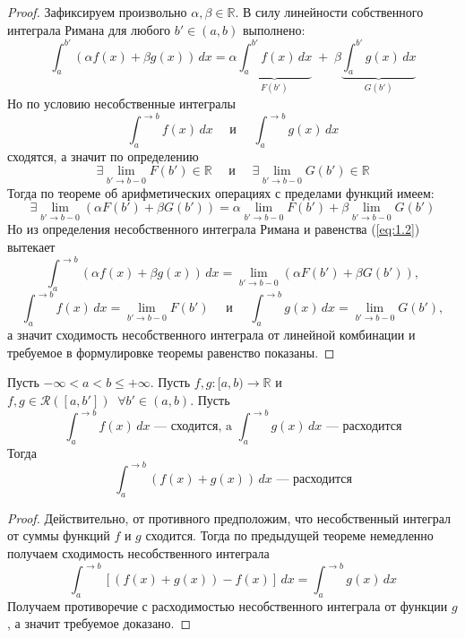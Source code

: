 \documentclass[11pt]{article}
\begin{document}
\begin{proof}
    Зафиксируем произвольно $\alpha, \beta \in \mathbb{R}$. В силу линейности собственного интеграла Римана для любого $b' \in (a, b)$ выполнено:
    \begin{equation*} \label{eq:1.2} \tag{$\ast \ast$}
      \int_{a}^{b'} (\alpha f(x) + \beta g(x)) \, dx = \alpha \underbrace{\int_{a}^{b'} f(x) \, dx}_{F(b')} \; + \; \beta \underbrace{\int_{a}^{b'} g(x) \, dx}_{G(b')}  
    \end{equation*}
    Но по условию несобственные интегралы
    \[\int_{a}^{\to b} f(x) \, dx \quad \text{ и } \quad \int_{a}^{\to b} g(x) \, dx\]
    сходятся, а значит по определению 
    \[\exists \lim_{b' \to b - 0} F(b') \in \mathbb{R} \quad \text{ и } \quad \exists \lim_{b' \to b - 0} G(b') \in \mathbb{R}\]
    Тогда по теореме об арифметических операциях с пределами функций имеем:
    \[\exists \lim_{b' \to b - 0} (\alpha F(b') + \beta G(b')) = \alpha \lim_{b' \to b - 0} F(b') + \beta \lim_{b' \to b - 0} G(b')\]
    Но из определения несобственного интеграла Римана и равенства (\ref{eq:1.2}) вытекает
    \[\int_{a}^{\to b} (\alpha f(x) + \beta g(x)) \, dx = \lim_{b' \to b - 0} (\alpha F(b') + \beta G(b')),\]
    \[\int_{a}^{\to b} f(x) \, dx = \lim_{b' \to b - 0} F(b') \quad \text{ и } \quad \int_{a}^{\to b} g(x) \, dx = \lim_{b' \to b - 0} G(b'),\]
    а значит сходимость несобственного интеграла от линейной комбинации и требуемое в формулировке теоремы равенство показаны.
\end{proof}

\begin{consequence}
    Пусть $- \infty < a < b \leq + \infty$. Пусть $f, g \colon [a, b) \to \mathbb{R}$ и $f, g \in \mathcal{R}([a, b']) \; \; \forall b' \in (a, b)$. Пусть 
    \[\int_{a}^{\to b} f(x) \, dx \text{ --- сходится, a } \int_{a}^{\to b} g(x) \, dx \text{ --- расходится}\]
    Тогда 
    \[\int_{a}^{\to b} (f(x) + g(x)) \, dx \text{ --- расходится}\]
\end{consequence}

\begin{proof}
    Действительно, от противного предположим, что несобственный интеграл от суммы функций $f$ и $g$ сходится. Тогда по предыдущей теореме немедленно получаем сходимость несобственного интеграла
    \[\int_{a}^{\to b} \left[(f(x) + g(x)) - f(x)\right] \, dx = \int_{a}^{\to b} g(x) \, dx\]
    Получаем противоречие с расходимостью несобственного интеграла от функции $g$, а значит требуемое доказано. 
\end{proof}
\end{document}
